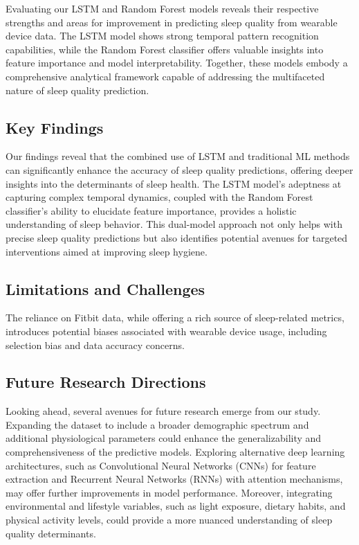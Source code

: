 \documentclass[10pt]{extarticle}
\begin{document}
Evaluating our LSTM and Random Forest models reveals their respective strengths and areas for improvement in predicting sleep quality from wearable device data. The LSTM model shows strong temporal pattern recognition capabilities, while the Random Forest classifier offers valuable insights into feature importance and model interpretability. Together, these models embody a comprehensive analytical framework capable of addressing the multifaceted nature of sleep quality prediction.

\subsection{Key Findings}

Our findings reveal that the combined use of LSTM and traditional ML methods can significantly enhance the accuracy of sleep quality predictions, offering deeper insights into the determinants of sleep health. The LSTM model's adeptness at capturing complex temporal dynamics, coupled with the Random Forest classifier's ability to elucidate feature importance, provides a holistic understanding of sleep behavior. This dual-model approach not only helps with precise sleep quality predictions but also identifies potential avenues for targeted interventions aimed at improving sleep hygiene.

\subsection{Limitations and Challenges}

The reliance on Fitbit data, while offering a rich source of sleep-related metrics, introduces potential biases associated with wearable device usage, including selection bias and data accuracy concerns.

\subsection{Future Research Directions}

Looking ahead, several avenues for future research emerge from our study. Expanding the dataset to include a broader demographic spectrum and additional physiological parameters could enhance the generalizability and comprehensiveness of the predictive models. Exploring alternative deep learning architectures, such as Convolutional Neural Networks (CNNs) for feature extraction and Recurrent Neural Networks (RNNs) with attention mechanisms, may offer further improvements in model performance. Moreover, integrating environmental and lifestyle variables, such as light exposure, dietary habits, and physical activity levels, could provide a more nuanced understanding of sleep quality determinants.
\end{document}
